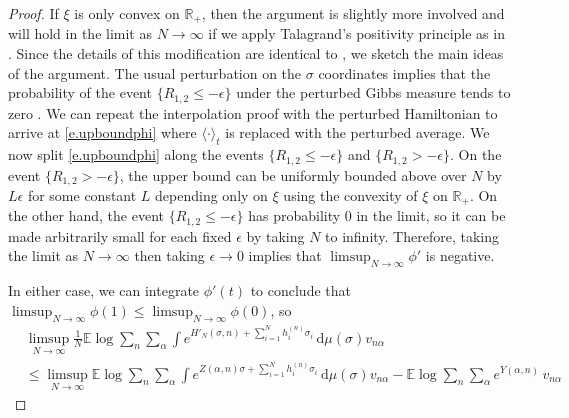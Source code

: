 \documentclass[11pt]{amsart}
\theoremstyle{remark}
\theoremstyle{definition}
\numberwithin{equation}{section}
\numberwithin{proposition}{section}
\numberwithin{figure}{section}
\numberwithin{table}{section}
\newcommand{\R}{\mathbb{R}}
\newcommand{\E}{\mathbb{E}}
\renewcommand{\leq}{\leqslant}
\renewcommand{\d}{\mathrm{d}}
\newcommand{\1}{\mathbf{1}}
\newcommand{\pnp}{{(n)}}
\begin{document}
\begin{proof}
If $\xi$ is only convex on $\R_+$, then the argument is slightly more involved and will hold in the limit as $N \to \infty$ if we apply Talagrand's positivity principle as in \cite[Chapter 3.2]{pan}. Since the details of this modification are identical to \cite[Chapter 3.2]{pan}, we sketch the main ideas of the argument. The usual perturbation on the $\sigma$ coordinates implies that the probability of the event $\{ R_{1,2} \leq -\epsilon \}$ under the perturbed Gibbs measure tends to zero \cite[Theorem 3.4]{pan}. We can repeat the interpolation proof with the perturbed Hamiltonian to arrive at \eqref{e.upboundphi}  where $\langle \cdot \rangle_t$ is replaced with the perturbed average. We now split \eqref{e.upboundphi} along the events   $\{ R_{1,2} \leq -\epsilon \}$ and  $\{ R_{1,2} > - \epsilon \}$. On the event  $\{ R_{1,2} > - \epsilon \}$, the upper bound can be uniformly bounded above over $N$ by $L \epsilon$ for some constant $L$ depending only on $\xi$ using the convexity of $\xi$ on $\R_+$. On the other hand, the event $\{ R_{1,2} \leq -\epsilon \}$ has probability $0$ in the limit, so it can be made arbitrarily small for each fixed $\epsilon$ by taking $N$ to infinity. Therefore, taking the limit as $N \to \infty$ then taking $\epsilon \to 0$ implies that $\limsup_{N \to \infty}\phi'$ is negative.

In either case,  we can integrate $\phi'(t)$ to conclude that $\limsup_{N \to \infty} \phi(1) \leq \limsup_{N \to \infty} \phi(0)$, so
\begin{align*}
    &\limsup_{N \to \infty} \frac{1}{N} \E \log \sum_{n} \sum_{\alpha}  \int e^{H'_N(\sigma,n) + \sum_{i=1}^N h^\pnp_i \sigma_i} \, \d\mu(\sigma) v_{n \alpha} 
    \\
    &\leq \limsup_{N \to \infty}  \E \log \sum_{n} \sum_{\alpha}  \int e^{Z(\alpha,n) \sigma + \sum_{i=1}^N h^\pnp_i \sigma_i} \, \d\mu(\sigma) v_{n \alpha} -  \E \log \sum_{n} \sum_{\alpha} e^{Y(\alpha,n) } \, v_{n \alpha}
\end{align*}
 

\end{proof}
\end{document}
